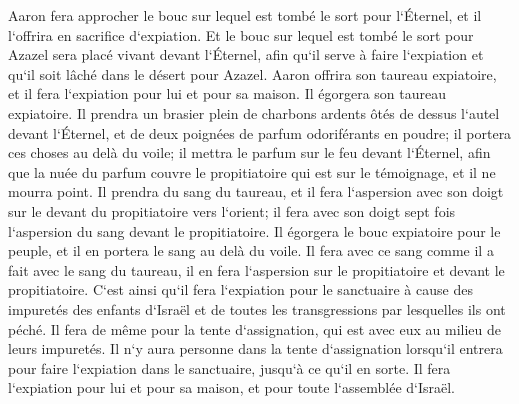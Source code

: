 \verse Aaron fera approcher le bouc sur lequel est tombé le sort pour l`Éternel, et il l`offrira en sacrifice d`expiation. 
\verse Et le bouc sur lequel est tombé le sort pour Azazel sera placé vivant devant l`Éternel, afin qu`il serve à faire l`expiation et qu`il soit lâché dans le désert pour Azazel. 
\verse Aaron offrira son taureau expiatoire, et il fera l`expiation pour lui et pour sa maison. Il égorgera son taureau expiatoire. 
\verse Il prendra un brasier plein de charbons ardents ôtés de dessus l`autel devant l`Éternel, et de deux poignées de parfum odoriférants en poudre; il portera ces choses au delà du voile; 
\verse il mettra le parfum sur le feu devant l`Éternel, afin que la nuée du parfum couvre le propitiatoire qui est sur le témoignage, et il ne mourra point. 
\verse Il prendra du sang du taureau, et il fera l`aspersion avec son doigt sur le devant du propitiatoire vers l`orient; il fera avec son doigt sept fois l`aspersion du sang devant le propitiatoire. 
\verse Il égorgera le bouc expiatoire pour le peuple, et il en portera le sang au delà du voile. Il fera avec ce sang comme il a fait avec le sang du taureau, il en fera l`aspersion sur le propitiatoire et devant le propitiatoire. 
\verse C`est ainsi qu`il fera l`expiation pour le sanctuaire à cause des impuretés des enfants d`Israël et de toutes les transgressions par lesquelles ils ont péché. Il fera de même pour la tente d`assignation, qui est avec eux au milieu de leurs impuretés. 
\verse Il n`y aura personne dans la tente d`assignation lorsqu`il entrera pour faire l`expiation dans le sanctuaire, jusqu`à ce qu`il en sorte. Il fera l`expiation pour lui et pour sa maison, et pour toute l`assemblée d`Israël. 
